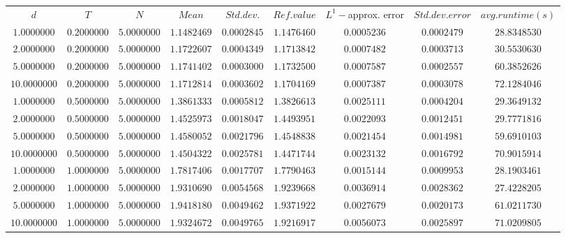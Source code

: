 \begin{tabular}{ccccccccc}
$d$ & $T$ & $N$ & $Mean$ & $Std. dev.$ & $Ref. value$ & $L^1-$approx. error & $Std. dev. error$ & $avg. runtime (s)$\\
$1.0000000$ & $0.2000000$ & $5.0000000$ & $1.1482469$ & $0.0002845$ & $1.1476460$ & $0.0005236$ & $0.0002479$ & $28.8348530$\\
$2.0000000$ & $0.2000000$ & $5.0000000$ & $1.1722607$ & $0.0004349$ & $1.1713842$ & $0.0007482$ & $0.0003713$ & $30.5530630$\\
$5.0000000$ & $0.2000000$ & $5.0000000$ & $1.1741402$ & $0.0003000$ & $1.1732500$ & $0.0007587$ & $0.0002557$ & $60.3852626$\\
$10.0000000$ & $0.2000000$ & $5.0000000$ & $1.1712814$ & $0.0003602$ & $1.1704169$ & $0.0007387$ & $0.0003078$ & $72.1284046$\\
$1.0000000$ & $0.5000000$ & $5.0000000$ & $1.3861333$ & $0.0005812$ & $1.3826613$ & $0.0025111$ & $0.0004204$ & $29.3649132$\\
$2.0000000$ & $0.5000000$ & $5.0000000$ & $1.4525973$ & $0.0018047$ & $1.4493951$ & $0.0022093$ & $0.0012451$ & $29.7771816$\\
$5.0000000$ & $0.5000000$ & $5.0000000$ & $1.4580052$ & $0.0021796$ & $1.4548838$ & $0.0021454$ & $0.0014981$ & $59.6910103$\\
$10.0000000$ & $0.5000000$ & $5.0000000$ & $1.4504322$ & $0.0025781$ & $1.4471744$ & $0.0023132$ & $0.0016792$ & $70.9015914$\\
$1.0000000$ & $1.0000000$ & $5.0000000$ & $1.7817406$ & $0.0017707$ & $1.7790463$ & $0.0015144$ & $0.0009953$ & $28.1903461$\\
$2.0000000$ & $1.0000000$ & $5.0000000$ & $1.9310690$ & $0.0054568$ & $1.9239668$ & $0.0036914$ & $0.0028362$ & $27.4228205$\\
$5.0000000$ & $1.0000000$ & $5.0000000$ & $1.9418180$ & $0.0049462$ & $1.9371922$ & $0.0027679$ & $0.0020173$ & $61.0211730$\\
$10.0000000$ & $1.0000000$ & $5.0000000$ & $1.9324672$ & $0.0049765$ & $1.9216917$ & $0.0056073$ & $0.0025897$ & $71.0209805$\\
\end{tabular}

